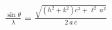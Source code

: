 


\begin{eqnarray*}
  \frac{\sin \theta}{\lambda} = \frac{\sqrt{\left(h^2+k^2\right) c^2 + \ell^2\,a^2}}{2\,a\,c}
\end{eqnarray*}

